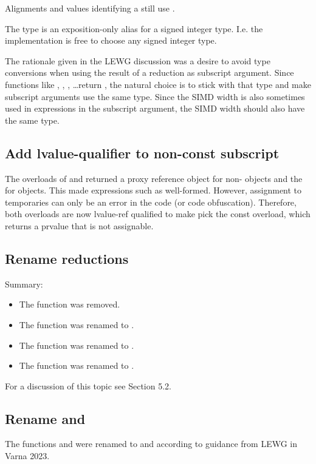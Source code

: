 Alignments and values identifying a  still use .

The type \simdsizetype{} is an exposition-only alias for a signed integer type.
I.e. the implementation is free to choose any signed integer type.

The rationale given in the LEWG discussion was a desire to avoid type
conversions when using the result of a \mask reduction as subscript argument.
Since  functions like , ,
, \ldots return , the natural choice is to
stick with that type and make subscript arguments use the same type.
Since the SIMD width is also sometimes used in expressions in the subscript
argument, the SIMD width should also have the same type.

\subsection{Add lvalue-qualifier to non-const subscript}\label{sec:lvalue-subscript}
The  overloads of \simd and \mask returned a
proxy reference object for non- objects and the 
for  objects.
This made expressions such as  well-formed.
However, assignment to temporaries can only be an error in the code (or code obfuscation).
Therefore, both  overloads are now lvalue-ref qualified to
make  pick the const overload, which returns a prvalue that is
not assignable.

\subsection{Rename  reductions}
Summary:
\begin{itemize}
  \item The function \stdx{} was removed.
  \item The function \stdx{} was renamed to \std{}.
  \item The function \stdx{} was renamed to \std{}.
  \item The function \stdx{} was renamed to \std{}.
\end{itemize}

For a discussion of this topic see  Section 5.2.

\subsection{Rename  and }\label{sec:hminhmax}
The functions  and  were renamed to
 and  according to guidance from LEWG in
Varna 2023.

